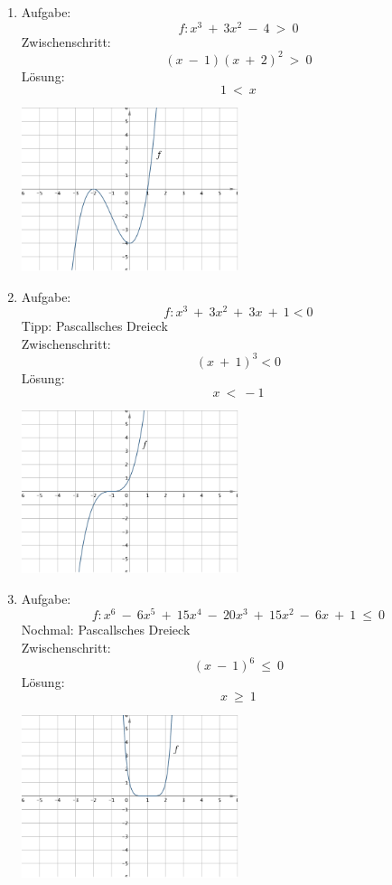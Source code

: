 \begin{enumerate}
\begin{center}
					\end{center}
	\item Aufgabe:
					\[f : x^3 \ + \ 3x^2 \ - \ 4 \ > \ 0\]
				Zwischenschritt:
					\[(x \ - \ 1)(x \ + \ 2)^2 \ > \ 0\]
				L\"osung:	
					\[1 \ < \ x\]
					\begin{center}
						\includegraphics[width=0.5\textwidth]{img/Aufgaben/Analytisch/A4.PNG}
					\end{center}
	\item Aufgabe:
					\[f : x^3 \ + \ 3x^2 \ + \ 3x \ + \ 1 < 0\]
				Tipp: Pascallsches Dreieck \\
				Zwischenschritt:
					\[(x \ + \ 1)^3 < 0\]
				L\"osung:
					\[x \ < \ -1\]
					\begin{center}
						\includegraphics[width=0.5\textwidth]{img/Aufgaben/Analytisch/A5.PNG}
					\end{center}
	\item Aufgabe:
					\[f : x^6 \ - \ 6x^5 \ + \ 15x^4 \ - \ 20x^3 \ + \ 15x^2 \ - \ 6x \ + \ 1 \ \leq \ 0\]
				Nochmal: Pascallsches Dreieck \\
				Zwischenschritt:
					\[(x \ - \ 1)^6 \ \leq \ 0\]
				L\"osung:
					\[x \ \geq \ 1\]
					\begin{center}
						\includegraphics[width=0.5\textwidth]{img/Aufgaben/Analytisch/A6.PNG}

\end{center}
\end{enumerate}

